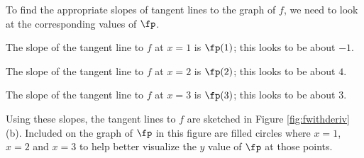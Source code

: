 {To find the appropriate slopes of tangent lines to the graph of $f$, we need to look at the corresponding values of $\fp$.

The slope of the tangent line to $f$ at $x=1$ is $\fp(1)$; this looks to be about $-1$. %

The slope of the tangent line to $f$ at $x=2$ is $\fp(2)$; this looks to be about $4$. 

The slope of the tangent line to $f$ at $x=3$ is $\fp(3)$; this looks to be about $3$. 

Using these slopes, the tangent lines to $f$ are sketched in Figure \ref{fig:fwithderiv}(b). Included on the graph of $\fp$ in this figure are filled circles where $x=1$, $x=2$ and $x=3$ to help better visualize the $y$ value of $\fp$ at those points. 
}\\


